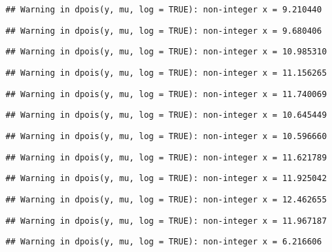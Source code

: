 \documentclass[
]{article}
\begin{document}
\begin{verbatim}
## Warning in dpois(y, mu, log = TRUE): non-integer x = 9.210440
\end{verbatim}

\begin{verbatim}
## Warning in dpois(y, mu, log = TRUE): non-integer x = 9.680406
\end{verbatim}

\begin{verbatim}
## Warning in dpois(y, mu, log = TRUE): non-integer x = 10.985310
\end{verbatim}

\begin{verbatim}
## Warning in dpois(y, mu, log = TRUE): non-integer x = 11.156265
\end{verbatim}

\begin{verbatim}
## Warning in dpois(y, mu, log = TRUE): non-integer x = 11.740069
\end{verbatim}

\begin{verbatim}
## Warning in dpois(y, mu, log = TRUE): non-integer x = 10.645449
\end{verbatim}

\begin{verbatim}
## Warning in dpois(y, mu, log = TRUE): non-integer x = 10.596660
\end{verbatim}

\begin{verbatim}
## Warning in dpois(y, mu, log = TRUE): non-integer x = 11.621789
\end{verbatim}

\begin{verbatim}
## Warning in dpois(y, mu, log = TRUE): non-integer x = 11.925042
\end{verbatim}

\begin{verbatim}
## Warning in dpois(y, mu, log = TRUE): non-integer x = 12.462655
\end{verbatim}

\begin{verbatim}
## Warning in dpois(y, mu, log = TRUE): non-integer x = 11.967187
\end{verbatim}

\begin{verbatim}
## Warning in dpois(y, mu, log = TRUE): non-integer x = 6.216606
\end{verbatim}
\end{document}
